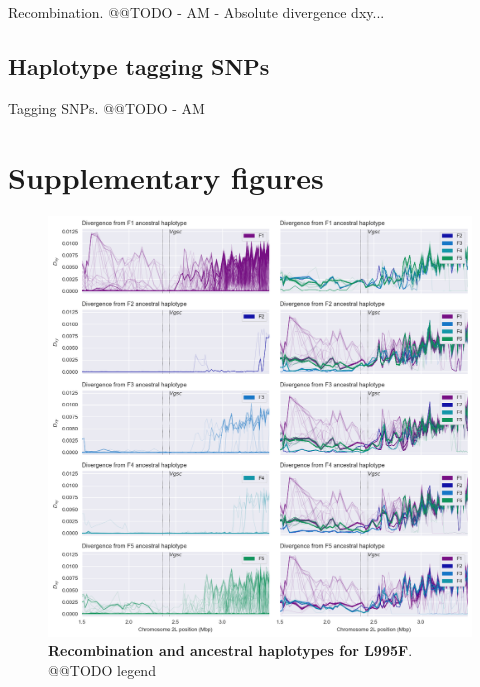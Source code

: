 \documentclass[a4paper,11pt,abstracton,hidelinks]{scrartcl}
\newcommand{\beginsupplement}{%
  \setcounter{table}{0}
  \renewcommand{\thetable}{S\arabic{table}}%
  \setcounter{figure}{0}
  \renewcommand{\thefigure}{S\arabic{figure}}%
}
\begin{document}
%
Recombination. @@TODO - AM - Absolute divergence dxy...


\subsection*{Haplotype tagging SNPs}

%
Tagging SNPs. @@TODO - AM



\printbibliography


\beginsupplement
\section*{Supplementary figures}


\clearpage

%
\begin{figure}[!t]
  \includegraphics[width=1.1\linewidth,center]{artwork/fig_recom_F.png}
  \caption{\textbf{Recombination and ancestral haplotypes for L995F}. @@TODO legend}
  \label{fig:recom_f}
\end{figure}
\end{document}
